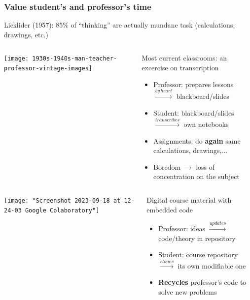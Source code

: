 \documentclass[aspectratio=169]{beamer}
\begin{document}
\begin{frame}
	\frametitle{Value student's and professor's time}
	Licklider (1957): 85\% of ``thinking'' are actually mundane task (calculations, drawings, etc.)
	\pause
	\begin{block}{}
	  \begin{columns}[b]
			\begin{column}{0.25\textwidth}
				\texttt{[image: 1930s-1940s-man-teacher-professor-vintage-images]}
			\end{column}
			\begin{column}{0.65\textwidth}
				Most current classrooms: an excercise on transcription
				\begin{itemize}[<+->]
					\item Professor: prepares lessons \(\xrightarrow{by\, heart}\) blackboard/slides
					\item Student: blackboard/slides \(\xrightarrow{transcribes}\) own notebooks
					\item Assignments: do \textbf{again} same calculations, drawings,...
					\item Boredom \(\rightarrow \) loss of concentration on the subject
				\end{itemize}
			\end{column}
		\end{columns}
	\end{block}
	\pause
	\begin{block}{}
	  \begin{columns}[b]
			\begin{column}{0.25\textwidth}
				\texttt{[image: "Screenshot 2023-09-18 at 12-24-03 Google Colaboratory"]}
			\end{column}
			\begin{column}{0.65\textwidth}
				Digital course material with embedded code
				\begin{itemize}[<+->]
					\item Professor: ideas \(\xrightarrow{updates}\) code/theory in repository
					\item Student: course repository \(\xrightarrow{clones}\) its own modifiable one
					\item \textbf{Recycles} professor's code to solve new problems
				\end{itemize}
			\end{column}
		\end{columns}
	\end{block}
\end{frame}
\end{document}
